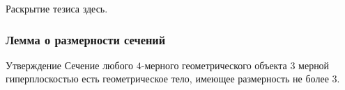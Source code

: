\documentclass[10pt,pdf,hyperref={unicode}]{beamer}
\begin{document}
\begin{frame}
	Раскрытие тезиса здесь.
\end{frame}
\begin{frame}
	\frametitle{Лемма о размерности сечений}
{\small
	\begin{block}{Утверждение}
		Сечение любого $4$-мерного геометрического объекта $3$ мерной гиперплоскостью есть геометрическое тело, имеющее размерность не более $3$. 
	\end{block}
}
	\begin{columns}

\end{columns}
\end{frame}
\end{document}
